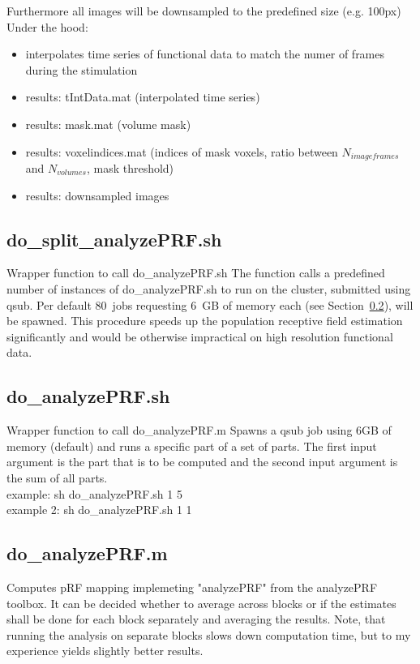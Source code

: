 \documentclass[12pt,a4paper]{scrartcl}
\begin{document}
\noindent Furthermore all images will be downsampled to the predefined size (e.g. 100px)\\

\noindent Under the hood:
\begin{itemize}
\item interpolates time series of functional data to match the numer of frames during the stimulation
\item results: tIntData.mat (interpolated time series)
\item results: mask.mat (volume mask)
\item results: voxelindices.mat (indices of mask voxels, ratio between $N_{imageframes}$ and $N_{volumes}$, mask threshold)
\item results: downsampled images
\end{itemize}

\subsection{do\_split\_analyzePRF.sh}
\label{sec:splitanalyzePRF.sh}
Wrapper function to call do\_analyzePRF.sh The function calls a predefined number of instances of do\_analyzePRF.sh to run on the cluster, submitted using qsub. Per default 80~jobs requesting 6~GB of memory each (see Section~\ref{sec:analyzePRF.sh}), will be spawned. This procedure speeds up the population receptive field estimation significantly and would be otherwise impractical on high resolution functional data.\\

\subsection{do\_analyzePRF.sh}
\label{sec:analyzePRF.sh}
Wrapper function to call do\_analyzePRF.m Spawns a qsub job using 6GB of memory (default) and runs a specific part of a set of parts. The first input argument is the part that is to be computed and the second input argument is the sum of all parts.\\

\noindent example: sh do\_analyzePRF.sh 1 5\\

\noindent example 2: sh do\_analyzePRF.sh 1 1

\subsection{do\_analyzePRF.m}
Computes pRF mapping implemeting "analyzePRF" from the analyzePRF toolbox. It can be decided whether to average across blocks or if the estimates shall be done for each block separately and averaging the results. Note, that running the analysis on separate blocks slows down computation time, but to my experience yields slightly better results.\\
\end{document}
